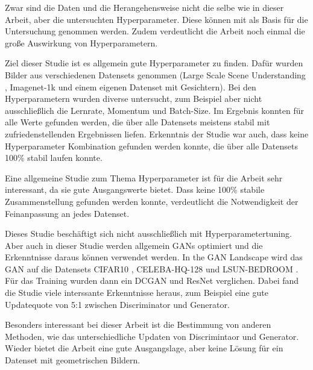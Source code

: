 Zwar sind die Daten und die Herangehensweise nicht die selbe wie in dieser Arbeit, aber die untersuchten Hyperparameter.
Diese können mit als Basis für die Untersuchung genommen werden.
Zudem verdeutlicht die Arbeit noch einmal die große Auswirkung von Hyperparametern.

Ziel dieser Studie ist es allgemein gute Hyperparameter zu finden.
Dafür wurden Bilder aus verschiedenen Datensets genommen (Large Scale Scene Understanding \cite{dataset:lsun}, Imagenet-1k \cite{dataset:image-net} und einem eigenen Datenset mit Gesichtern).
Bei den Hyperparametern wurden diverse untersucht, zum Beispiel aber nicht ausschließlich die Lernrate, Momentum und Batch-Size.
Im Ergebnis konnten für alle Werte gefunden werden, die über alle Datensets meistens stabil mit zufriedenstellenden Ergebnissen liefen.
Erkenntnis der Studie war auch, dass keine Hyperparameter Kombination gefunden werden konnte, die über alle Datensets 100\% stabil laufen konnte.
\newline

Eine allgemeine Studie zum Thema Hyperparameter ist für die Arbeit sehr interessant, da sie gute Ausgangswerte bietet.
Dass keine 100\% stabile Zusammenstellung gefunden werden konnte, verdeutlicht die Notwendigkeit der Feinanpassung an jedes Datenset.


Dieses Studie beschäftigt sich nicht ausschließlich mit Hyperparametertuning.
Aber auch in dieser Studie werden allgemein GANs optimiert und die Erkenntnisse daraus können verwendet werden.
In the GAN Landscape wird das GAN auf die Datensets CIFAR10 \cite{dataset:cifar10}, CELEBA-HQ-128 und LSUN-BEDROOM \cite{dataset:lsun}.
Für das Training wurden dann ein DCGAN und ResNet verglichen.
Dabei fand die Studie viele interssante Erkenntnisse heraus, zum Beispiel eine gute Updatequote von 5:1 zwischen Discriminator und Generator.
\newline

Besonders interessant bei dieser Arbeit ist die Bestimmung von anderen Methoden, wie das unterschiedliche Updaten von Discrimintaor und Generator.
Wieder bietet die Arbeit eine gute Ausgangslage, aber keine Lösung für ein Datenset mit geometrischen Bildern.

